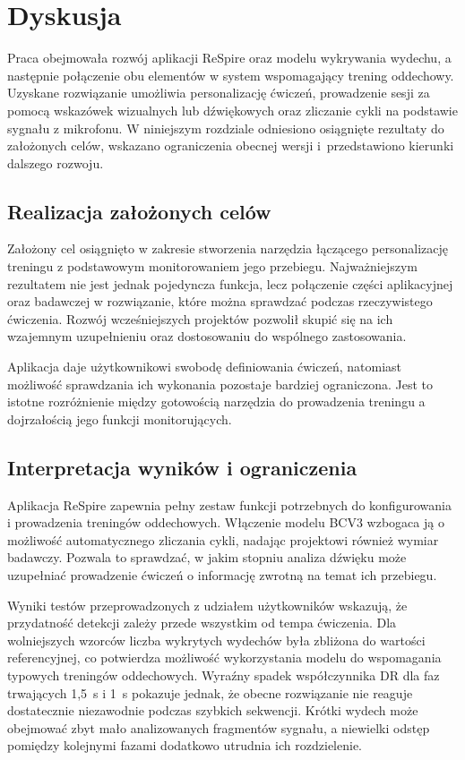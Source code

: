 \chapter{Dyskusja}

Praca obejmowała rozwój aplikacji ReSpire oraz modelu wykrywania wydechu, a następnie połączenie obu elementów w system wspomagający trening oddechowy. Uzyskane rozwiązanie umożliwia personalizację ćwiczeń, prowadzenie sesji za pomocą wskazówek wizualnych lub dźwiękowych oraz zliczanie cykli na podstawie sygnału z mikrofonu. W niniejszym rozdziale odniesiono osiągnięte rezultaty do założonych celów, wskazano ograniczenia obecnej wersji i~przedstawiono kierunki dalszego rozwoju.

\section{Realizacja założonych celów}

Założony cel osiągnięto w zakresie stworzenia narzędzia łączącego personalizację treningu z podstawowym monitorowaniem jego przebiegu. Najważniejszym rezultatem nie jest jednak pojedyncza funkcja, lecz połączenie części aplikacyjnej oraz badawczej w rozwiązanie, które można sprawdzać podczas rzeczywistego ćwiczenia. Rozwój wcześniejszych projektów pozwolił skupić się na ich wzajemnym uzupełnieniu oraz dostosowaniu do wspólnego zastosowania.

Aplikacja daje użytkownikowi swobodę definiowania ćwiczeń, natomiast możliwość sprawdzania ich wykonania pozostaje bardziej ograniczona. Jest to istotne rozróżnienie między gotowością narzędzia do prowadzenia treningu a dojrzałością jego funkcji monitorujących.

\section{Interpretacja wyników i ograniczenia}

Aplikacja ReSpire zapewnia pełny zestaw funkcji potrzebnych do konfigurowania i prowadzenia treningów oddechowych. Włączenie modelu BCV3 wzbogaca ją o możliwość automatycznego zliczania cykli, nadając projektowi również wymiar badawczy. Pozwala to sprawdzać, w jakim stopniu analiza dźwięku może uzupełniać prowadzenie ćwiczeń o informację zwrotną na temat ich przebiegu.

Wyniki testów przeprowadzonych z udziałem użytkowników wskazują, że przydatność detekcji zależy przede wszystkim od tempa ćwiczenia. Dla wolniejszych wzorców liczba wykrytych wydechów była zbliżona do wartości referencyjnej, co potwierdza możliwość wykorzystania modelu do wspomagania typowych treningów oddechowych. Wyraźny spadek współczynnika DR dla faz trwających 1,5~s i 1~s pokazuje jednak, że obecne rozwiązanie nie reaguje dostatecznie niezawodnie podczas szybkich sekwencji. Krótki wydech może obejmować zbyt mało analizowanych fragmentów sygnału, a niewielki odstęp pomiędzy kolejnymi fazami dodatkowo utrudnia ich rozdzielenie.

